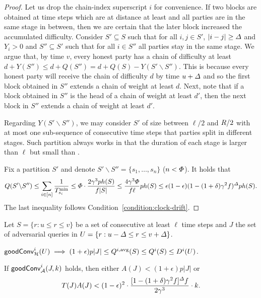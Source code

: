 \begin{proof}
    Let us drop the chain-index superscript $i$ for convenience.
    If two blocks are obtained at time steps which are at distance at least \delay and all parties are in the same stage in between, then we are certain that the later block increased the accumulated difficulty.
    Consider $S' \subseteq S$ such that for all $i, j \in S'$, $|i - j| \ge \varDelta$ and $Y_i > 0$ and $S'' \subseteq S'$ such that for all $i \in S''$ all parties stay in the same stage.
    We argue that, by time $v$, every honest party has a chain of difficulty at least $d + Y(S'') \le d + Q(S'') = d + Q(S) - Y(S' \backslash S'')$.
    This is because every honest party will receive the chain of difficulty $d$ by time $u + \varDelta$ and so the first block obtained in $S''$ extends a chain of weight at least $d$.
    Next, note that if a block obtained in $S''$ is the head of a chain of weight at least $d'$, then the next block in $S''$ extends a chain of weight at least $d'$.

    Regarding $Y(S' \backslash S'')$, we may consider $S'$ of size between $\ell / 2$ and $R / 2$ with at most one sub-sequence of consecutive time steps that parties split in different stages.
    Such partition always works in that the duration of each stage is larger than $\ell$ but small than \syncLen.

    Fix a partition $S'$ and denote $S' \backslash S'' = \{s_1, \ldots, s_n \}$ ($n < \varPhi$).
    It holds that
    \begin{equation*}
        Q(S' \backslash S'')
        \le
        \sum_{i \in [n]} \frac{1}{T^{\mathrm{min}}_{s_i}}
        \le
        \varPhi \cdot \frac{2 \gamma^3 p h(S)}{f |S|}
        \le
        \frac{4 \gamma^3 \varPhi}{f \ell} ph(S)
        \le
        \epsilon(1 - \epsilon)(1 - (1 + \delta) \gamma^2 f)^\varDelta p h(S).
    \end{equation*}
    The last inequality follows Condition~\eqref{condition:clock-drift}.
\end{proof}


\begin{lemma} \label{lemma:random-variable-bounds}
    Let $S = \{r : u \le r \le v \}$ be a set of consecutive at least $\ell$ time steps and $J$ the set of adversarial queries in $U = \{r : u - \varDelta \le r \le v + \varDelta \}$.
    \begin{cccItemize}[nosep]
        \item $\mathsf{goodConv}^i_{\mathcal{H}}(U) \implies (1 + \epsilon) p|J| \le Q^{i, \mathrm{avg}}(S) \le Q^i(S) \le D^i(U)$.

        \item If $\mathsf{goodConv}^i_{\mathcal{A}}(J, k)$ holds, then either $A(J) < (1 + \epsilon)p|J|$ or
        \[ T(J)A(J) < (1 - \epsilon)^2 \cdot \frac{[1 - (1 + \delta) \gamma^2 f]^{\varDelta} f}{2  \gamma^3} \cdot k. \]
    \end{cccItemize}
\end{lemma}

